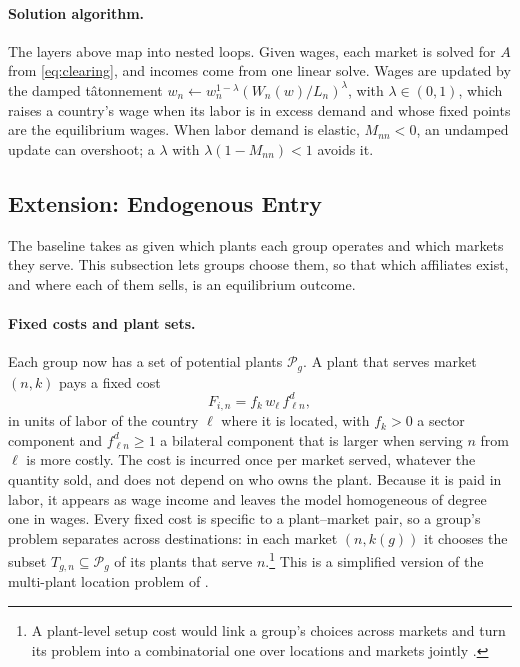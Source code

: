 \documentclass[11pt]{article}
\newcommand{\cP}{\mathcal P}
\begin{document}
\paragraph{Solution algorithm.} The layers above map into nested loops. Given wages,
each market is solved for $A$ from \eqref{eq:clearing}, and incomes come from one
linear solve. Wages are updated by the damped tâtonnement
$w_n\leftarrow w_n^{1-\lambda}(W_n(w)/L_n)^{\lambda}$, with $\lambda\in(0,1)$, which raises
a country's wage when its labor is in excess demand and whose fixed points are the
equilibrium wages. When labor demand is elastic, $M_{nn}<0$, an undamped update can
overshoot; a $\lambda$ with $\lambda(1-M_{nn})<1$ avoids it.

\subsection{Extension: Endogenous Entry}
\label{sec:entry}

The baseline takes as given which plants each group operates and which markets they
serve. This subsection lets groups choose them, so that which affiliates exist, and
where each of them sells, is an equilibrium outcome.

\paragraph{Fixed costs and plant sets.} Each group now has a set of potential plants
$\cP_g$. A plant that serves market $(n,k)$ pays a fixed cost
\begin{equation}
  F_{i,n}=f_k\,w_\ell\,f^d_{\ell n},
  \label{eq:fixed}
\end{equation}
in units of labor of the country $\ell$ where it is located, with $f_k>0$ a sector
component and $f^d_{\ell n}\ge1$ a bilateral component that is larger when serving $n$
from $\ell$ is more costly. The cost is incurred once per market served, whatever the quantity
sold, and does not depend on who owns the plant. Because it is paid in labor, it appears
as wage income and leaves the model homogeneous of degree one in wages. Every fixed cost
is specific to a plant--market pair, so a group's problem separates across
destinations: in each market $(n,k(g))$ it chooses the subset $T_{g,n}\subseteq\cP_g$ of
its plants that serve $n$.\footnote{A plant-level setup cost would link a group's
choices across markets and turn its problem into a combinatorial one over locations and
markets jointly \citep{Tintelnot2017}.} This is a simplified version of the multi-plant
location problem of \citet{Yang2023}.
\end{document}
